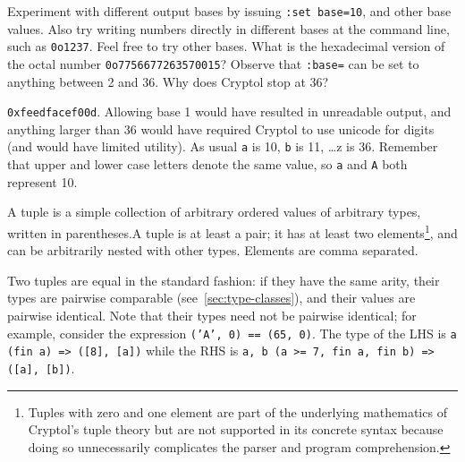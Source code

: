 \begin{Exercise}\label{ex:setBase}
  Experiment with different output bases by issuing {\tt :set
    base=10}, and other base values. Also try writing numbers directly
  in different bases at the command line, such as {\tt 0o1237}.  Feel
  free to try other bases.  What is the hexadecimal version of the
  octal number {\tt 0o7756677263570015}?  Observe that {\tt :base=}
  can be set to anything between 2 and 36. Why does Cryptol stop at
  36?
\end{Exercise}
\begin{Answer}
{\tt 0xfeedfacef00d}.
Allowing base 1 would have resulted in unreadable output, and anything
larger than 36 would have required Cryptol to use unicode for digits
(and would have limited utility). As usual {\tt a} is 10, {\tt b} is
11, \ldots z is 36. Remember that upper and lower case letters denote
the same value, so {\tt a} and {\tt A} both represent 10.
\end{Answer}



A tuple is a simple collection of arbitrary ordered values of
arbitrary types, written in parentheses.\indTheTupleType A tuple is at
least a pair; it has at least two elements\footnote{Tuples with zero
  and one element are part of the underlying mathematics of Cryptol's
  tuple theory but are not supported in its concrete syntax because
  doing so unnecessarily complicates the parser and program
  comprehension.}, and can be arbitrarily nested with other types.
Elements are comma separated.  

Two tuples are equal in the standard fashion: if they have the same
arity, their types are pairwise comparable
(see~\autoref{sec:type-classes}), and their values are pairwise
identical.  Note that their types need not be pairwise identical; for
example, consider the expression \texttt{('A', 0) == (65, 0)}.  The
type of the LHS is \texttt{{a} (fin a) => ([8], [a])} while the RHS is
\texttt{{a, b} (a >= 7, fin a, fin b) => ([a], [b])}.

